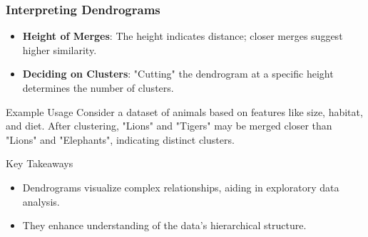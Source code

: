 \documentclass[aspectratio=169]{beamer}
\begin{document}
\begin{frame}[fragile]
    \frametitle{Interpreting Dendrograms}
    \begin{itemize}
        \item \textbf{Height of Merges}: The height indicates distance; closer merges suggest higher similarity.
        \item \textbf{Deciding on Clusters}: "Cutting" the dendrogram at a specific height determines the number of clusters.
    \end{itemize}
    
    \begin{block}{Example Usage}
    Consider a dataset of animals based on features like size, habitat, and diet. After clustering, "Lions" and "Tigers" may be merged closer than "Lions" and "Elephants", indicating distinct clusters.
    \end{block}

    \begin{block}{Key Takeaways}
        \begin{itemize}
            \item Dendrograms visualize complex relationships, aiding in exploratory data analysis.
            \item They enhance understanding of the data's hierarchical structure.
        \end{itemize}
    \end{block}
\end{frame}
\end{document}
